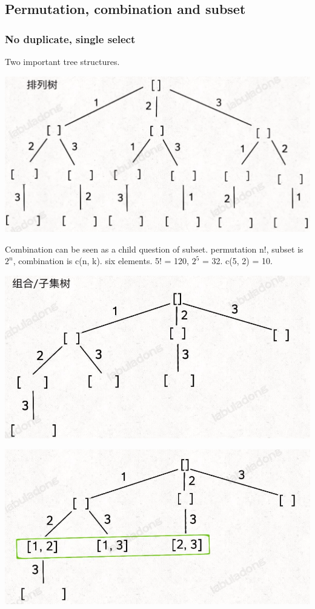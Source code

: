 \documentclass[a4paper,11pt,twoside]{book}
\begin{document}
\subsection{Permutation, combination and subset}
\subsubsection{No duplicate, single select}

	\par Two important tree structures.
\begin{center}
	\includegraphics[width=0.5\linewidth]{pics/per}
\end{center}

\par Combination can be seen as a child question of subset.  permutation n!,  subset is $2^n$,  combination is c(n, k). six elements.  5! = 120,  $2^5$ = 32.  c(5, 2) = 10. 

\begin{minipage}{.5\textwidth}		
	\begin{center}
		\includegraphics[width=0.8\linewidth]{pics/com} 
	\end{center}
\end{minipage}	
\begin{minipage}{.5\textwidth}		
	\begin{center}
		\includegraphics[width=0.8\linewidth]{pics/subset}
	\end{center}
\end{minipage}
\end{document}
